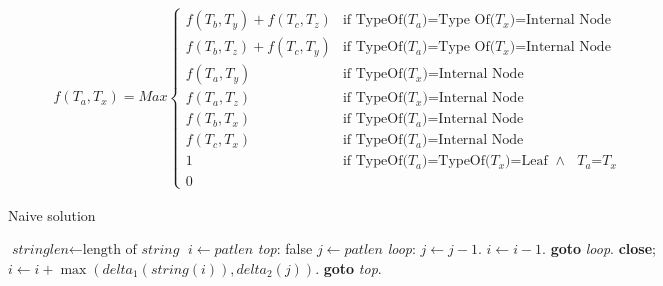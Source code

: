 \begin{equation*}
	\begin{aligned}
		f(T_a,T_x)=Max
		\begin{cases}
			f(T_b,T_y)+f(T_c,T_z) & \text{if TypeOf($T_a$)=Type Of($T_x$)=Internal Node}
			\\
			f(T_b,T_z)+f(T_c,T_y) &  \text{if TypeOf($T_a$)=Type Of($T_x$)=Internal Node}
			\\
			f(T_a, T_y)           & \text{if TypeOf($T_x$)=Internal Node}
			\\
			f(T_a, T_z)           & \text{if TypeOf($T_x$)=Internal Node}
			\\
			f(T_b, T_x)           & \text{if TypeOf($T_a$)=Internal Node}
			\\
			f(T_c, T_x)           & \text{if TypeOf($T_a$)=Internal Node}
			\\
			1 	                  & \text{if TypeOf($T_a$)=TypeOf($T_x$)=Leaf  $\land$  $T_a$=$T_x$}
			\\
			0                     
		\end{cases}
	\end{aligned}
	\phantom{\hspace{6cm}}
\end{equation*}


\begin{algorithm}
	\caption{Naive solution}\label{euclid}
	\begin{algorithmic}[1]
		\State $\textit{stringlen} \gets \text{length of }\textit{string}$
		\State $i \gets \textit{patlen}$
		\BState \emph{top}:
		 \Return false
		\EndIf
		\State $j \gets \textit{patlen}$
		\BState \emph{loop}:
		\State $j \gets j-1$.
		\State $i \gets i-1$.
		\State \textbf{goto} \emph{loop}.
		\State \textbf{close};
		\EndIf
		\State $i \gets i+\max(\textit{delta}_1(\textit{string}(i)),\textit{delta}_2(j))$.
		\State \textbf{goto} \emph{top}.
		\EndProcedure
	\end{algorithmic}
\end{algorithm}


